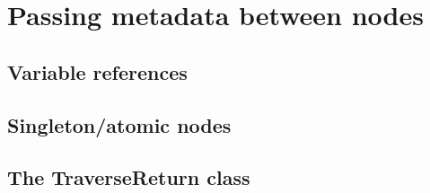 \section{Passing metadata between nodes}

\subsection{Variable references}
\subsection{Singleton/atomic nodes}
\subsection{The TraverseReturn class}